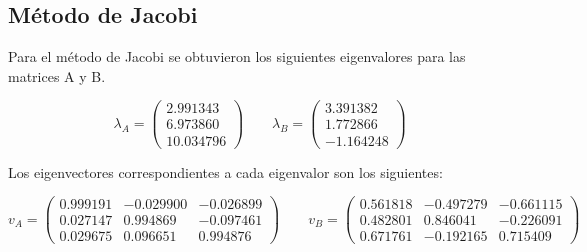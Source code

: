 \subsection{Método de Jacobi}

Para el método de Jacobi se obtuvieron los siguientes eigenvalores para las matrices A y B.

\begin{equation*}
    \lambda_A = \begin{pmatrix}
        2.991343 \\
        6.973860 \\
        10.034796
    \end{pmatrix}
    \qquad
    \lambda_B = \begin{pmatrix}
        3.391382 \\
        1.772866 \\
        -1.164248
    \end{pmatrix}
\end{equation*}

Los eigenvectores correspondientes a cada eigenvalor son los siguientes:

\begin{equation*}
    v_A = \begin{pmatrix}
        0.999191 & -0.029900 & -0.026899 \\
        0.027147 & 0.994869  & -0.097461 \\
        0.029675 & 0.096651  & 0.994876
    \end{pmatrix}
    \qquad
    v_B = \begin{pmatrix}
        0.561818 & -0.497279 & -0.661115 \\
        0.482801 & 0.846041  & -0.226091 \\
        0.671761 & -0.192165 & 0.715409
    \end{pmatrix}
\end{equation*}